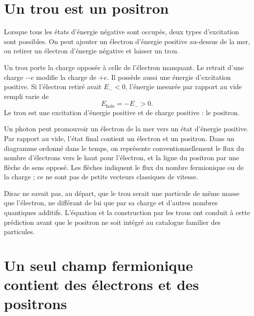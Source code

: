 \section{Un trou est un positron}

Lorsque tous les états d’énergie négative sont occupés, deux types d’excitation sont possibles. On peut ajouter un électron d’énergie positive au-dessus de la mer, ou retirer un électron d’énergie négative et laisser un trou.

Un trou porte la charge opposée à celle de l’électron manquant. Le retrait d’une charge \(-e\) modifie la charge de \(+e\). Il possède aussi une énergie d’excitation positive. Si l’électron retiré avait \(E_-<0\), l’énergie mesurée par rapport au vide rempli varie de
\begin{equation}
E_{\mathrm{hole}}=-E_->0.
\end{equation}
Le trou est une excitation d’énergie positive et de charge positive : le positron.

Un photon peut promouvoir un électron de la mer vers un état d’énergie positive. Par rapport au vide, l’état final contient un électron et un positron. Dans un diagramme ordonné dans le temps, on représente conventionnellement le flux du nombre d’électrons vers le haut pour l’électron, et la ligne du positron par une flèche de sens opposé. Les flèches indiquent le flux du nombre fermionique ou de la charge ; ce ne sont pas de petits vecteurs classiques de vitesse.

\begin{classroomqa}
\end{classroomqa}

Dirac ne savait pas, au départ, que le trou serait une particule de même masse que l’électron, ne différant de lui que par sa charge et d’autres nombres quantiques additifs. L’équation et la construction par les trous ont conduit à cette prédiction avant que le positron ne soit intégré au catalogue familier des particules.

\section{Un seul champ fermionique contient des électrons et des positrons}

